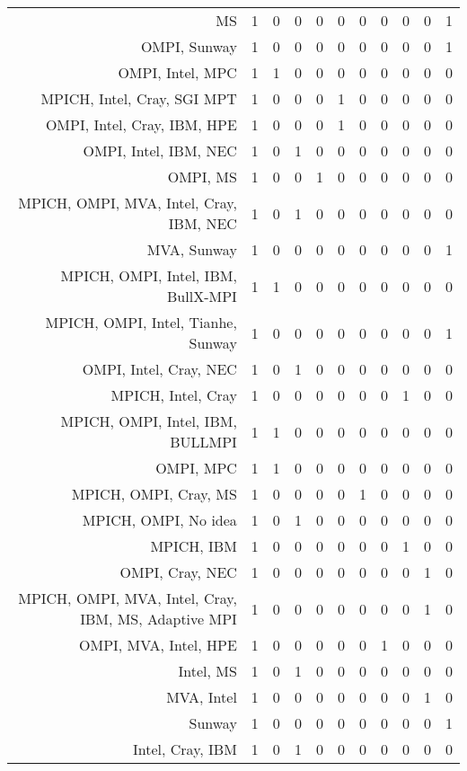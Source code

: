 {\begin{landscape}
\begin{longtable}[htb]{r|c|c|c|c|c|c|c|c|c|c}
{MS} & 1 & 0 & 0 & 0 & 0 & 0 & 0 & 0 & 0 & 1 \\%
{OMPI, Sunway} & 1 & 0 & 0 & 0 & 0 & 0 & 0 & 0 & 0 & 1 \\%
{OMPI, Intel, MPC} & 1 & 1 & 0 & 0 & 0 & 0 & 0 & 0 & 0 & 0 \\%
{MPICH, Intel, Cray, SGI MPT} & 1 & 0 & 0 & 0 & 1 & 0 & 0 & 0 & 0 & 0 \\%
{OMPI, Intel, Cray, IBM, HPE} & 1 & 0 & 0 & 0 & 1 & 0 & 0 & 0 & 0 & 0 \\%
{OMPI, Intel, IBM, NEC} & 1 & 0 & 1 & 0 & 0 & 0 & 0 & 0 & 0 & 0 \\%
{OMPI, MS} & 1 & 0 & 0 & 1 & 0 & 0 & 0 & 0 & 0 & 0 \\%
{MPICH, OMPI, MVA, Intel, Cray, IBM, NEC} & 1 & 0 & 1 & 0 & 0 & 0 & 0 & 0 & 0 & 0 \\%
{MVA, Sunway} & 1 & 0 & 0 & 0 & 0 & 0 & 0 & 0 & 0 & 1 \\%
{MPICH, OMPI, Intel, IBM, BullX-MPI} & 1 & 1 & 0 & 0 & 0 & 0 & 0 & 0 & 0 & 0 \\%
{MPICH, OMPI, Intel, Tianhe, Sunway} & 1 & 0 & 0 & 0 & 0 & 0 & 0 & 0 & 0 & 1 \\%
{OMPI, Intel, Cray, NEC} & 1 & 0 & 1 & 0 & 0 & 0 & 0 & 0 & 0 & 0 \\%
{MPICH, Intel, Cray} & 1 & 0 & 0 & 0 & 0 & 0 & 0 & 1 & 0 & 0 \\%
{MPICH, OMPI, Intel, IBM, BULLMPI} & 1 & 1 & 0 & 0 & 0 & 0 & 0 & 0 & 0 & 0 \\%
{OMPI, MPC} & 1 & 1 & 0 & 0 & 0 & 0 & 0 & 0 & 0 & 0 \\%
{MPICH, OMPI, Cray, MS} & 1 & 0 & 0 & 0 & 0 & 1 & 0 & 0 & 0 & 0 \\%
{MPICH, OMPI, No idea} & 1 & 0 & 1 & 0 & 0 & 0 & 0 & 0 & 0 & 0 \\%
{MPICH, IBM} & 1 & 0 & 0 & 0 & 0 & 0 & 0 & 1 & 0 & 0 \\%
{OMPI, Cray, NEC} & 1 & 0 & 0 & 0 & 0 & 0 & 0 & 0 & 1 & 0 \\%
{MPICH, OMPI, MVA, Intel, Cray, IBM, MS, Adaptive MPI} & 1 & 0 & 0 & 0 & 0 & 0 & 0 & 0 & 1 & 0 \\%
{OMPI, MVA, Intel, HPE} & 1 & 0 & 0 & 0 & 0 & 0 & 1 & 0 & 0 & 0 \\%
{Intel, MS} & 1 & 0 & 1 & 0 & 0 & 0 & 0 & 0 & 0 & 0 \\%
{MVA, Intel} & 1 & 0 & 0 & 0 & 0 & 0 & 0 & 0 & 1 & 0 \\%
{Sunway} & 1 & 0 & 0 & 0 & 0 & 0 & 0 & 0 & 0 & 1 \\%
{Intel, Cray, IBM} & 1 & 0 & 1 & 0 & 0 & 0 & 0 & 0 & 0 & 0 \\%

\end{longtable}
\end{landscape}}
